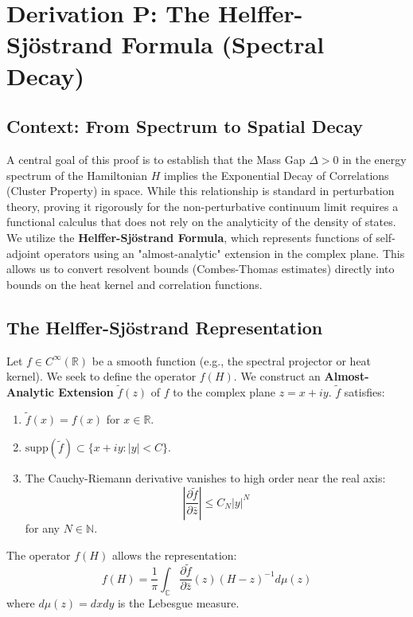 \chapter{Derivation P: The Helffer-Sjöstrand Formula (Spectral Decay)}
\label{ch:derivation_p_helffer_sjostrand}

\section{Context: From Spectrum to Spatial Decay}
A central goal of this proof is to establish that the Mass Gap $\Delta > 0$ in the energy spectrum of the Hamiltonian $H$ implies the Exponential Decay of Correlations (Cluster Property) in space.
While this relationship is standard in perturbation theory, proving it rigorously for the non-perturbative continuum limit requires a functional calculus that does not rely on the analyticity of the density of states.
We utilize the \textbf{Helffer-Sjöstrand Formula}, which represents functions of self-adjoint operators using an "almost-analytic" extension in the complex plane. This allows us to convert resolvent bounds (Combes-Thomas estimates) directly into bounds on the heat kernel and correlation functions.

\section{The Helffer-Sjöstrand Representation}
Let $f \in C^\infty(\mathbb{R})$ be a smooth function (e.g., the spectral projector or heat kernel). We seek to define the operator $f(H)$.
We construct an \textbf{Almost-Analytic Extension} $\tilde{f}(z)$ of $f$ to the complex plane $z = x + iy$. $\tilde{f}$ satisfies:
\begin{enumerate}
    \item $\tilde{f}(x) = f(x)$ for $x \in \mathbb{R}$.
    \item  $\text{supp}(\tilde{f}) \subset \{ x+iy : |y| < C \}$.
    \item The Cauchy-Riemann derivative vanishes to high order near the real axis:
    \begin{equation}
    \left| \frac{\partial \tilde{f}}{\partial \bar{z}} \right| \le C_N |y|^N
    \end{equation}
    for any $N \in \mathbb{N}$.
\end{enumerate}

The operator $f(H)$ allows the representation:
\begin{equation}
f(H) = \frac{1}{\pi} \int_{\mathbb{C}} \frac{\partial \tilde{f}}{\partial \bar{z}}(z) (H - z)^{-1} d\mu(z)
\end{equation}
where $d\mu(z) = dx dy$ is the Lebesgue measure.

